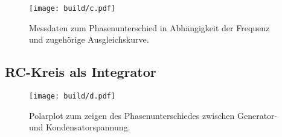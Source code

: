 \begin{figure}
    \centering
    \caption{Messdaten zum Phasenunterschied in Abhängigkeit der Frequenz und zugehörige Ausgleichskurve.}
    \texttt{[image: build/c.pdf]}
\end{figure}


\subsection{RC-Kreis als Integrator} %
\label{sub:RC-Kreis als Integrator}


\begin{figure}
    \centering
    \caption{Polarplot zum zeigen des Phasenunterschiedes zwischen Generator- und Kondensatorspannung.}
    \texttt{[image: build/d.pdf]}
\end{figure}

%
